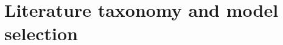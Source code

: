 \section{Literature taxonomy and model selection}
\label{sec:background:literature-taxonomy-model-selection}
